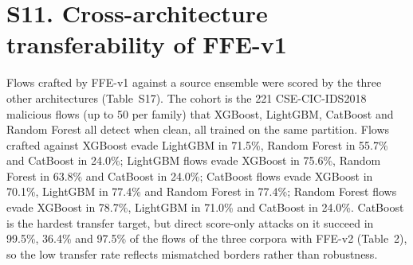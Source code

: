 \begin{table}[!htbp]
\centering
\caption*{Table S14. FFE-v1 with and without tree-split boundary snapping (XGBoost, Real ASR with Wilson 95\% interval).}
\footnotesize

\end{table}

\begin{table}[!htbp]
\centering
\caption*{Table S15. Ablation of FFE-v1 on CUDA XGBoost, CSE-CIC-IDS2018 ($N=283$). Delay is the mean added flow duration.}
\footnotesize
\resizebox{\columnwidth}{!}{%
%
}
\end{table}

\begin{table}[!htbp]
\centering
\caption*{Table S16. FFE-v1 against XGBoost and LightGBM: clean test performance, Real ASR on the 1,000-flow cohort (Wilson 95\% intervals) and surrogate--target agreement.}
\scriptsize
\resizebox{\columnwidth}{!}{%
%
}
\end{table}

\section*{S11. Cross-architecture transferability of FFE-v1}

Flows crafted by FFE-v1 against a source ensemble were scored by the three other architectures (Table~S17). The cohort is the 221 CSE-CIC-IDS2018 malicious flows (up to 50 per family) that XGBoost, LightGBM, CatBoost and Random Forest all detect when clean, all trained on the same partition. Flows crafted against XGBoost evade LightGBM in 71.5\%, Random Forest in 55.7\% and CatBoost in 24.0\%; LightGBM flows evade XGBoost in 75.6\%, Random Forest in 63.8\% and CatBoost in 24.0\%; CatBoost flows evade XGBoost in 70.1\%, LightGBM in 77.4\% and Random Forest in 77.4\%; Random Forest flows evade XGBoost in 78.7\%, LightGBM in 71.0\% and CatBoost in 24.0\%. CatBoost is the hardest transfer target, but direct score-only attacks on it succeed in 99.5\%, 36.4\% and 97.5\% of the flows of the three corpora with FFE-v2 (Table~2), so the low transfer rate reflects mismatched borders rather than robustness.

\begin{table}[!htbp]
\centering
\caption*{Table S17. Transferability of FFE-v1 flows (success rate in \%, $N=221$; diagonal: attack against the source model itself).}
\footnotesize
\resizebox{\columnwidth}{!}{%
%
}
\end{table}

